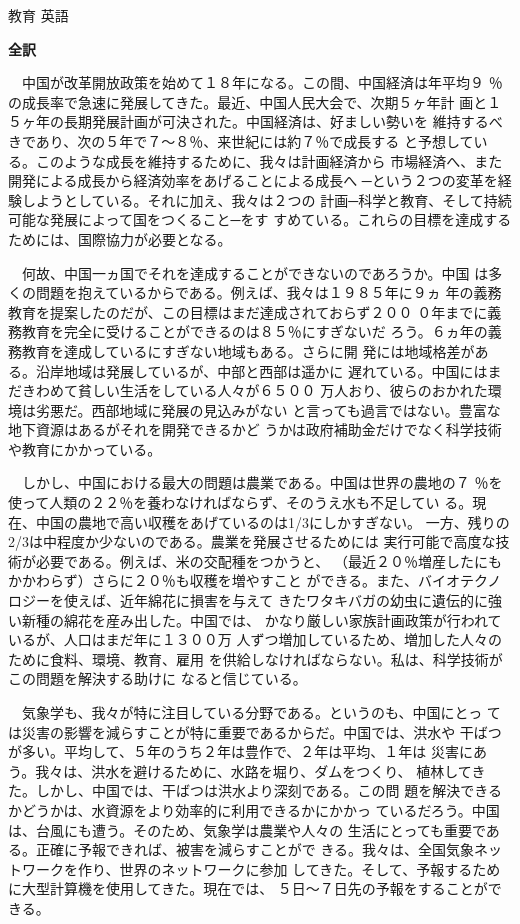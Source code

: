 \documentclass[fleqn]{jbook}
\begin{document}
\begin{answer}{教育 英語}{}
\begin{subanswers}

\SubAnswer 
{\bf 全訳} 
        
  　中国が改革開放政策を始めて１８年になる。この間、中国経済は年平均９
％の成長率で急速に発展してきた。最近、中国人民大会で、次期５ヶ年計
画と１５ヶ年の長期発展計画が可決された。中国経済は、好ましい勢いを
維持するべきであり、次の５年で７〜８％、来世紀には約７％で成長する
と予想している。このような成長を維持するために、我々は計画経済から
市場経済へ、また開発による成長から経済効率をあげることによる成長へ
─という２つの変革を経験しようとしている。それに加え、我々は２つの
計画─科学と教育、そして持続可能な発展によって国をつくること─をす
すめている。これらの目標を達成するためには、国際協力が必要となる。

  　何故、中国一ヵ国でそれを達成することができないのであろうか。中国
は多くの問題を抱えているからである。例えば、我々は１９８５年に９ヵ
年の義務教育を提案したのだが、この目標はまだ達成されておらず２００
０年までに義務教育を完全に受けることができるのは８５％にすぎないだ
ろう。６ヵ年の義務教育を達成しているにすぎない地域もある。さらに開
発には地域格差がある。沿岸地域は発展しているが、中部と西部は遥かに
遅れている。中国にはまだきわめて貧しい生活をしている人々が６５００
万人おり、彼らのおかれた環境は劣悪だ。西部地域に発展の見込みがない
と言っても過言ではない。豊富な地下資源はあるがそれを開発できるかど
うかは政府補助金だけでなく科学技術や教育にかかっている。

  　しかし、中国における最大の問題は農業である。中国は世界の農地の７
％を使って人類の２２％を養わなければならず、そのうえ水も不足してい
る。現在、中国の農地で高い収穫をあげているのは1/3にしかすぎない。
一方、残りの2/3は中程度か少ないのである。農業を発展させるためには
実行可能で高度な技術が必要である。例えば、米の交配種をつかうと、
（最近２０％増産したにもかかわらず）さらに２０％も収穫を増やすこと
ができる。また、バイオテクノロジーを使えば、近年綿花に損害を与えて
きたワタキバガの幼虫に遺伝的に強い新種の綿花を産み出した。中国では、
かなり厳しい家族計画政策が行われているが、人口はまだ年に１３００万
人ずつ増加しているため、増加した人々のために食料、環境、教育、雇用
を供給しなければならない。私は、科学技術がこの問題を解決する助けに
なると信じている。

  　気象学も、我々が特に注目している分野である。というのも、中国にとっ
ては災害の影響を減らすことが特に重要であるからだ。中国では、洪水や
干ばつが多い。平均して、５年のうち２年は豊作で、２年は平均、１年は
災害にあう。我々は、洪水を避けるために、水路を堀り、ダムをつくり、
植林してきた。しかし、中国では、干ばつは洪水より深刻である。この問
題を解決できるかどうかは、水資源をより効率的に利用できるかにかかっ
ているだろう。中国は、台風にも遭う。そのため、気象学は農業や人々の
生活にとっても重要である。正確に予報できれば、被害を減らすことがで
きる。我々は、全国気象ネットワークを作り、世界のネットワークに参加
してきた。そして、予報するために大型計算機を使用してきた。現在では、
５日〜７日先の予報をすることができる。


\end{subanswers}
\end{answer}
\end{document}
